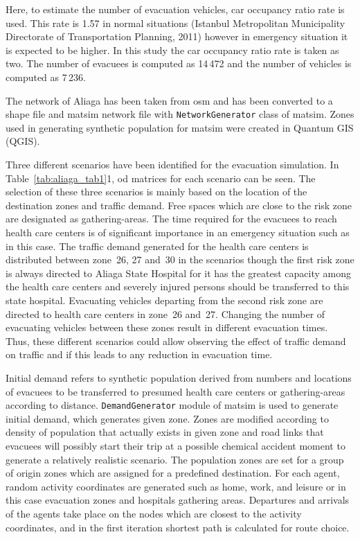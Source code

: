 Here, to estimate the number of evacuation vehicles, car occupancy ratio rate is used. This rate is 1.57 in normal situations \citep[][]{}(Istanbul Metropolitan Municipality Directorate of Transportation Planning, 2011) however in emergency situation it is expected to be higher. In this study the car occupancy ratio rate is taken as two. The number of evacuees is computed as 14\,472 and the number of vehicles is computed as 7\,236.

The network of Aliaga has been taken from \gls{osm} and has been converted to a shape file and \gls{matsim} network file with \lstinline|NetworkGenerator| class of \gls{matsim}. Zones used in generating synthetic population for \gls{matsim} were created in Quantum GIS (QGIS).

Three different scenarios have been identified for the evacuation simulation. In Table~\ref{tab:aliaga_tab1}1, \gls{od} matrices for each scenario can be seen. The selection of these three scenarios is mainly based on the location of the destination zones and traffic demand. Free spaces which are close to the risk zone are designated as gathering-areas. The time required for the evacuees to reach health care centers is of significant importance in an emergency situation such as in this case. The traffic demand generated for the health care centers is distributed between zone~26, 27 and~30 in the scenarios though the first risk zone is always directed to Aliaga State Hospital for it has the greatest capacity among the health care centers and severely injured persons should be transferred to this state hospital. Evacuating vehicles departing from the second risk zone are directed to health care centers in zone~26 and~27. Changing the number of evacuating vehicles between these zones result in different evacuation times. Thus, these different scenarios could allow observing the effect of traffic demand on traffic and if this leads to any reduction in evacuation time.

Initial demand refers to synthetic population derived from numbers and locations of evacuees to be transferred to presumed health care centers or gathering-areas according to distance. \lstinline|DemandGenerator| module of \gls{matsim}  is used to generate initial demand, which generates given zone. Zones are modified according to density of population that actually exists in given zone and road links that evacuees will possibly start their trip at a possible chemical accident moment to generate a relatively realistic scenario. The population zones are set for a group of origin zones which are assigned for a predefined destination. For each agent, random activity coordinates are generated such as home, work, and leisure or in this case evacuation zones and hospitals gathering areas. Departures and arrivals of the agents take place on the nodes which are closest to the activity coordinates, and in the first iteration shortest path is calculated for route choice.

